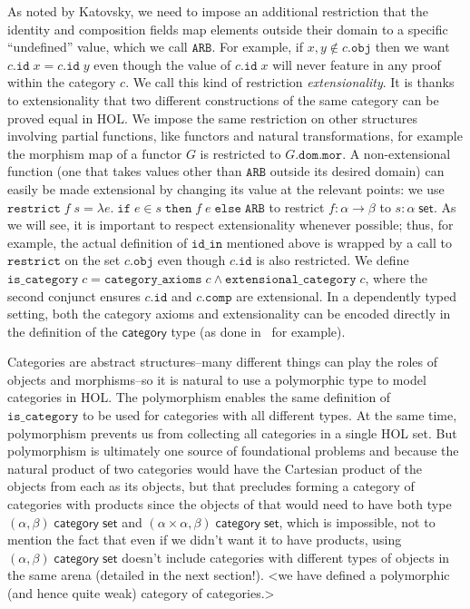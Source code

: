 \documentclass[twoside,titlepage,11pt]{article}
\begin{document}
As noted by Katovsky, we need to impose an additional restriction that the identity and composition fields map elements outside their domain to a specific ``undefined'' value, which we call $\mathtt{ARB}$.
For example, if $x,y\notin c.\mathtt{obj}$ then we want $c.\mathtt{id}\;x=c.\mathtt{id}\;y$ even though the value of $c.\mathtt{id}\;x$ will never feature in any proof within the category $c$.
We call this kind of restriction \emph{extensionality}.
It is thanks to extensionality that two different constructions of the same category can be proved equal in HOL.
We impose the same restriction on other structures involving partial functions, like functors and natural transformations, for example the morphism map of a functor $G$ is restricted to $G.\mathtt{dom}.\mathtt{mor}$.
A non-extensional function (one that takes values other than $\mathtt{ARB}$ outside its desired domain) can easily be made extensional by changing its value at the relevant points: we use $\mathtt{restrict}\;f\;s=\lambda{e}.\;\mathtt{if}\;e\in s\;\mathtt{then}\;f\;e\;\mathtt{else}\;\mathtt{ARB}$ to restrict $f:\alpha\to\beta$ to $s:\alpha\;\mathsf{set}$.
As we will see, it is important to respect extensionality whenever possible; thus, for example, the actual definition of $\mathtt{id\_in}$ mentioned above is wrapped by a call to $\mathtt{restrict}$ on the set $c.\mathtt{obj}$ even though $c.\mathtt{id}$ is also restricted.
We define $\mathtt{is\_category}\;c=\mathtt{category\_axioms}\;c\land\mathtt{extensional\_category}\;c$, where the second conjunct ensures $c.\mathtt{id}$ and $c.\mathtt{comp}$ are extensional.
In a dependently typed setting, both the category axioms and extensionality can be encoded directly in the definition of the $\mathsf{category}$ type (as done in~\cite{DBLP:conf/birthday/HuetS00,Sozeau,Megacz} for example).

Categories are abstract structures--many different things can play the roles of objects and morphisms--so it is natural to use a polymorphic type to model categories in HOL.
The polymorphism enables the same definition of $\mathtt{is\_category}$ to be used for categories with all different types.
At the same time, polymorphism prevents us from collecting all categories in a single HOL set.
But polymorphism is ultimately one source of foundational problems and because the natural product of two categories would have the Cartesian product of the objects from each as its objects, but that precludes forming a category of categories with products since the objects of that would need to have both type $(\alpha,\beta)\;\mathsf{category}\;\mathsf{set}$ and $(\alpha\times\alpha,\beta)\;\mathsf{category}\;\mathsf{set}$, which is impossible, not to mention the fact that even if we didn't want it to have products, using $(\alpha,\beta)\;\mathsf{category}\;\mathsf{set}$ doesn't include categories with different types of objects in the same arena (detailed in the next section!). 
<we have defined a polymorphic (and hence quite weak) category of categories.>
\end{document}
